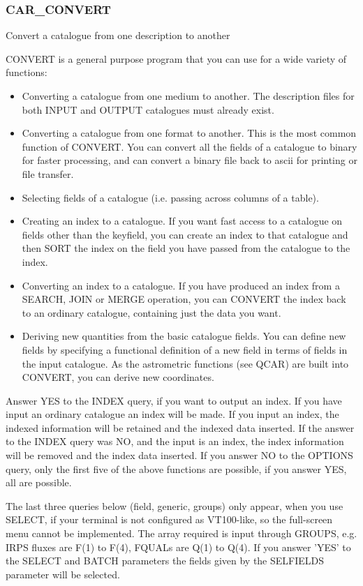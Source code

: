 \subsubsection{CAR\_CONVERT}

Convert a catalogue from one description to another

CONVERT is a general purpose program that you can use for
a wide variety of functions:
\begin{itemize}
\item Converting a catalogue from one medium to another.
The description files for both INPUT and OUTPUT catalogues must already exist.
\item Converting a catalogue from one format to another.
This is the most common function of CONVERT.
You can convert all the fields of a catalogue to binary for faster processing,
and can convert a binary file back to ascii for printing or file transfer.
\item Selecting fields of a catalogue (i.e. passing across columns of a table).
\item Creating an index to a catalogue.
If you want fast access to a catalogue on fields other than the keyfield, you
can create an index to that catalogue and then SORT the index on the field you
have passed from the catalogue to the index.
\item Converting an index to a catalogue.
If you have produced an index from a SEARCH, JOIN or MERGE operation, you can
CONVERT the index back to an ordinary catalogue, containing just the data you
want.
\item Deriving new quantities from the basic catalogue fields.
You can define new fields by specifying a functional definition of a new field
in terms of fields in the input catalogue.
As the astrometric functions (see QCAR) are built into CONVERT, you can derive
new coordinates.
\end{itemize}
Answer YES to the INDEX query, if you want to output an index.
If you have input an ordinary catalogue an index will be made.
If you input an index, the indexed information will be retained and the indexed
data inserted. If the answer to the INDEX query was NO, and the input is an
index, the index information will be removed and the index data inserted.
If you answer NO to the OPTIONS query, only the first five of the above
functions are possible, if you answer YES, all are possible.

The last three queries below (field, generic, groups) only appear, when you use
SELECT, if your terminal is not configured as VT100-like, so the full-screen
menu cannot be implemented.
The array required is input through GROUPS, e.g. IRPS fluxes are F(1) to
F(4), FQUALs are Q(1) to Q(4).
If you answer 'YES' to the SELECT and BATCH parameters the fields given by the
SELFIELDS parameter will be selected.

